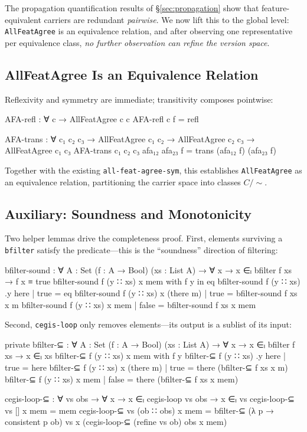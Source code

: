 \documentclass[9pt,a4paper]{article}
\theoremstyle{plain}
\theoremstyle{definition}
\theoremstyle{remark}
\begin{document}
The propagation quantification results of \S\ref{sec:propagation} show that feature-equivalent carriers are redundant \emph{pairwise}.  We now lift this to the global level: \texttt{AllFeatAgree} is an equivalence relation, and after observing one representative per equivalence class, \emph{no further observation can refine the version space}.

\subsection{AllFeatAgree Is an Equivalence Relation}

Reflexivity and symmetry are immediate; transitivity composes pointwise:

\begin{code}
    AFA-refl : ∀ c → AllFeatAgree c c
    AFA-refl c f = refl

    AFA-trans : ∀ c₁ c₂ c₃ →
      AllFeatAgree c₁ c₂ → AllFeatAgree c₂ c₃ → AllFeatAgree c₁ c₃
    AFA-trans c₁ c₂ c₃ afa₁₂ afa₂₃ f = trans (afa₁₂ f) (afa₂₃ f)
\end{code}

\noindent Together with the existing \texttt{all-feat-agree-sym}, this establishes \texttt{AllFeatAgree} as an equivalence relation, partitioning the carrier space into classes $C/{\sim}$.

\subsection{Auxiliary: Soundness and Monotonicity}

Two helper lemmas drive the completeness proof.  First, elements surviving a \texttt{bfilter} satisfy the predicate---this is the ``soundness'' direction of filtering:

\begin{code}
    bfilter-sound : ∀ {A : Set} (f : A → Bool) (xs : List A) →
      ∀ x → x ∈ₗ bfilter f xs → f x ≡ true
    bfilter-sound f (y ∷ xs) x mem with f y in eq
    bfilter-sound f (y ∷ xs) .y here        | true = eq
    bfilter-sound f (y ∷ xs) x  (there m)   | true = bfilter-sound f xs x m
    bfilter-sound f (y ∷ xs) x  mem         | false = bfilter-sound f xs x mem
\end{code}

\noindent Second, \texttt{cegis-loop} only removes elements---its output is a sublist of its input:

\begin{code}
    private
      bfilter-⊆ : ∀ {A : Set} (f : A → Bool) (xs : List A) →
        ∀ x → x ∈ₗ bfilter f xs → x ∈ₗ xs
      bfilter-⊆ f (y ∷ xs) x mem with f y
      bfilter-⊆ f (y ∷ xs) .y here        | true = here
      bfilter-⊆ f (y ∷ xs) x  (there m)   | true = there (bfilter-⊆ f xs x m)
      bfilter-⊆ f (y ∷ xs) x  mem         | false = there (bfilter-⊆ f xs x mem)

    cegis-loop-⊆ : ∀ vs obs →
      ∀ x → x ∈ₗ cegis-loop vs obs → x ∈ₗ vs
    cegis-loop-⊆ vs [] x mem = mem
    cegis-loop-⊆ vs (ob ∷ obs) x mem =
      bfilter-⊆ (λ p → consistent p ob) vs x
        (cegis-loop-⊆ (refine vs ob) obs x mem)
\end{code}
\end{document}
